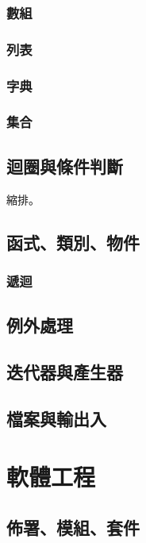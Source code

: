 \documentclass[a4paper,12pt]{book}
\theoremstyle{definition}
\begin{document}
\section{數組}

\section{列表}

\section{字典}

\section{集合}

\chapter{迴圈與條件判斷}
%
\label{c:control}

縮排。

\chapter{函式、類別、物件}
%
\label{c:structure}

\section{遞迴}

\chapter{例外處理}
%
\label{c:exception}

\chapter{迭代器與產生器}
%
\label{c:iterator}

\chapter{檔案與輸出入}
%
\label{c:inout}

\part{軟體工程}
%
\label{p:software}

\chapter{佈署、模組、套件}
%
\label{c:deployment}
\end{document}
